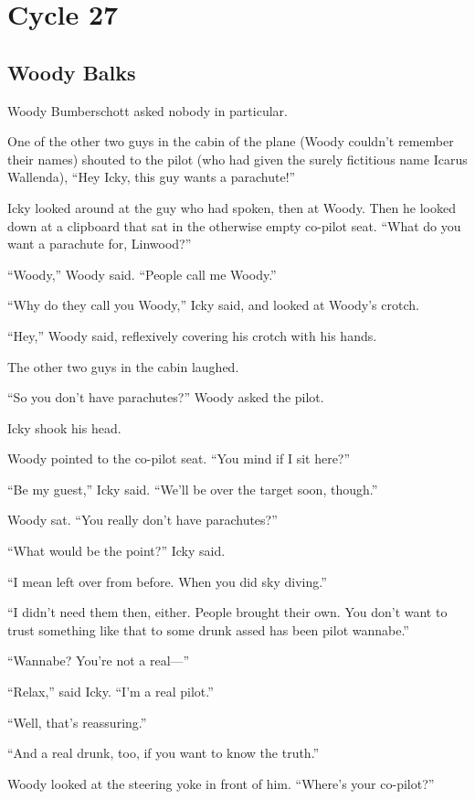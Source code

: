 \part{Cycle 27}

\chapter{Woody Balks}

 Woody Bumberschott asked nobody in particular.

One of the other two guys in the cabin of the plane (Woody couldn’t remember their names) shouted to the pilot (who had given the surely fictitious name Icarus Wallenda), “Hey Icky, this guy wants a parachute!”

Icky looked around at the guy who had spoken, then at Woody. Then he looked down at a clipboard that sat in the otherwise empty co-pilot seat. “What do you want a parachute for, Linwood?”

“Woody,” Woody said. “People call me Woody.”

“Why do they call you Woody,” Icky said, and looked at Woody’s crotch.

“Hey,” Woody said, reflexively covering his crotch with his hands.

The other two guys in the cabin laughed.

“So you don’t have parachutes?” Woody asked the pilot.

Icky shook his head.

Woody pointed to the co-pilot seat. “You mind if I sit here?”

“Be my guest,” Icky said. “We’ll be over the target soon, though.”

Woody sat. “You really don’t have parachutes?”

“What would be the point?” Icky said.

“I mean left over from before. When you did sky diving.”

“I didn’t need them then, either. People brought their own. You don’t want to trust something like that to some drunk assed has been pilot wannabe.”

“Wannabe? You’re not a real—”

“Relax,” said Icky. “I’m a real pilot.”

“Well, that’s reassuring.”

“And a real drunk, too, if you want to know the truth.”

Woody looked at the steering yoke in front of him. “Where’s your co-pilot?”

